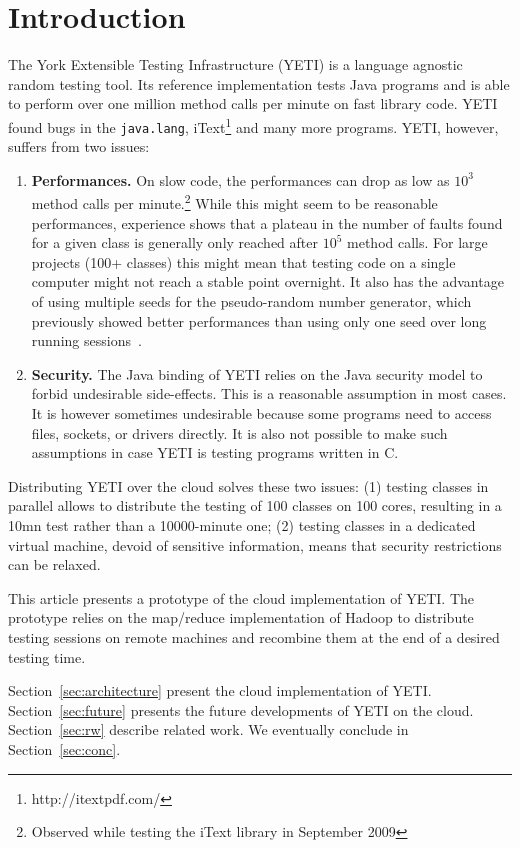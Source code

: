 \section{Introduction}
The York Extensible Testing Infrastructure (YETI) is a language agnostic 
random testing tool. Its reference implementation tests Java programs
and is able to perform over one million method calls per minute on fast library
code. YETI found bugs in the \texttt{java.lang}, iText\footnote{http://itextpdf.com/} and many more 
programs. YETI, however, suffers from two issues:
\begin{enumerate}
\item \textbf{Performances.} On slow code, the performances can drop as low as $10^{3}$
method calls per minute.\footnote{Observed while testing the iText library in 
September 2009} While this might seem to be reasonable performances, experience shows 
that a plateau in the number of faults found for a given class is generally only reached after 
$10^{5}$ method calls. For large projects (100+ classes) this might mean that testing 
code on a single computer might not reach a stable point overnight. It also has the advantage of
using multiple seeds for the pseudo-random number generator, which previously showed better
performances than using only one seed over long running sessions~\cite{CPLOM:08:PRTOOS}.
\item \textbf{Security.} The Java binding of YETI relies on the Java security model to forbid 
undesirable side-effects. This is a reasonable assumption in most cases. It is however
sometimes undesirable because some programs need to access files, sockets, or drivers 
directly. It is also not possible to make such assumptions in case YETI is testing 
programs written in C.
\end{enumerate}

Distributing YETI over the cloud solves these two issues: (1) testing classes in parallel
allows to distribute the testing of 100 classes on 100 cores, resulting in a 10mn test 
rather than a 10000-minute one; (2) testing classes in a dedicated virtual machine, devoid of sensitive 
information, means that security restrictions can be relaxed.

This article presents a prototype of the cloud implementation of YETI. The prototype relies
on the map/reduce implementation of Hadoop to distribute testing sessions on remote machines 
and recombine them at the end of a desired testing time.

Section~\ref{sec:architecture} present the cloud implementation of YETI. Section~\ref{sec:future} 
presents the future developments of YETI on the cloud. Section~\ref{sec:rw} describe related work.
We eventually conclude in Section~\ref{sec:conc}.
